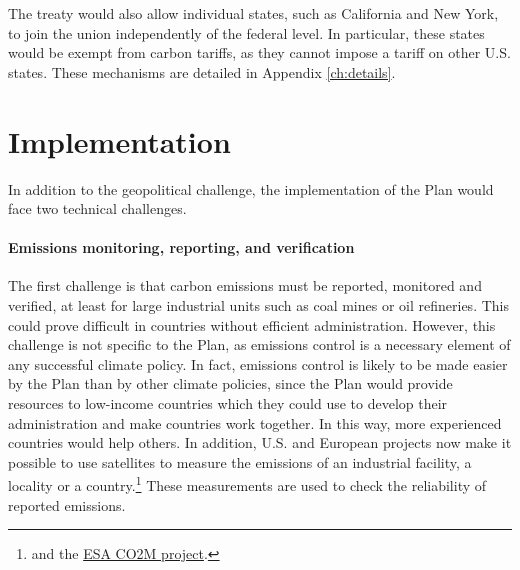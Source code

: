 \documentclass[a5paper,english,openany]{memoir}
\begin{document}
The treaty would also allow individual %
states, %
such as California and New York, %
to join the union independently of the federal level. In particular, these states would be exempt from carbon tariffs, %
as they cannot impose a tariff on other U.S. states. 
These mechanisms are detailed in Appendix \ref{ch:details}. 


\section*{Implementation}\label{sec:implementation}
In addition to the geopolitical challenge, the implementation of the Plan would face two technical challenges. 

\paragraph{Emissions monitoring, reporting, and verification}

The first challenge is that carbon emissions must be reported, monitored and verified, at least %
for large industrial units such as coal mines or oil refineries. This could prove difficult in countries without %
efficient administration. However, this challenge is not specific to the Plan, as emissions control is a necessary element of any successful climate policy. In fact, emissions control is likely to be made easier by the Plan than by other climate policies, since the Plan would provide resources to low-income countries which they could use to develop their administration %
and make %
countries work together. %
In this way, more experienced countries would help others. In addition, U.S. and European projects now make it possible to use satellites to measure the emissions of an industrial facility, a locality or a country.\footnote{\citet{pan_potential_2021,shen_national_2023} and the \href{https://www.esa.int/Applications/Observing_the_Earth/Copernicus/Carbon_dioxide_monitoring_satellite_given_the_shakes}{ESA CO2M project}.} These measurements are used to check the reliability of reported emissions.
\end{document}
